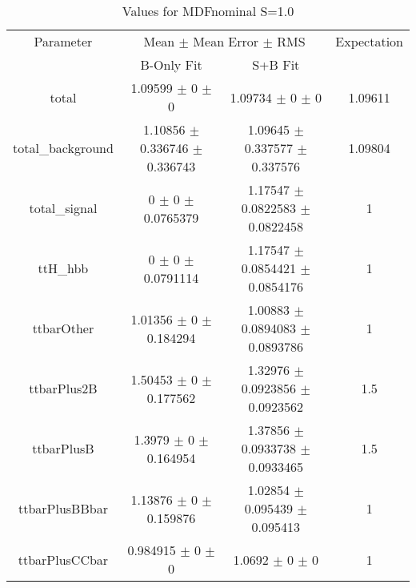\begin{table}
\centering
\caption{Values for MDFnominal S=1.0}
\begin{tabular}{cccc}
\toprule
Parameter & \multicolumn{2}{c}{Mean $\pm$ Mean Error $\pm$ RMS} & Expectation\\
 & B-Only Fit & S+B Fit & \\
\midrule
total & \num{1.09599} $\pm$ \num{0} $\pm$ \num{0} & \num{1.09734} $\pm$ \num{0} $\pm$ \num{0} & \num{1.09611}\\
total\_background & \num{1.10856} $\pm$ \num{0.336746} $\pm$ \num{0.336743} & \num{1.09645} $\pm$ \num{0.337577} $\pm$ \num{0.337576} & \num{1.09804}\\
total\_signal & \num{0} $\pm$ \num{0} $\pm$ \num{0.0765379} & \num{1.17547} $\pm$ \num{0.0822583} $\pm$ \num{0.0822458} & \num{1}\\
ttH\_hbb & \num{0} $\pm$ \num{0} $\pm$ \num{0.0791114} & \num{1.17547} $\pm$ \num{0.0854421} $\pm$ \num{0.0854176} & \num{1}\\
ttbarOther & \num{1.01356} $\pm$ \num{0} $\pm$ \num{0.184294} & \num{1.00883} $\pm$ \num{0.0894083} $\pm$ \num{0.0893786} & \num{1}\\
ttbarPlus2B & \num{1.50453} $\pm$ \num{0} $\pm$ \num{0.177562} & \num{1.32976} $\pm$ \num{0.0923856} $\pm$ \num{0.0923562} & \num{1.5}\\
ttbarPlusB & \num{1.3979} $\pm$ \num{0} $\pm$ \num{0.164954} & \num{1.37856} $\pm$ \num{0.0933738} $\pm$ \num{0.0933465} & \num{1.5}\\
ttbarPlusBBbar & \num{1.13876} $\pm$ \num{0} $\pm$ \num{0.159876} & \num{1.02854} $\pm$ \num{0.095439} $\pm$ \num{0.095413} & \num{1}\\
ttbarPlusCCbar & \num{0.984915} $\pm$ \num{0} $\pm$ \num{0} & \num{1.0692} $\pm$ \num{0} $\pm$ \num{0} & \num{1}\\
\bottomrule
\end{tabular}
\end{table}